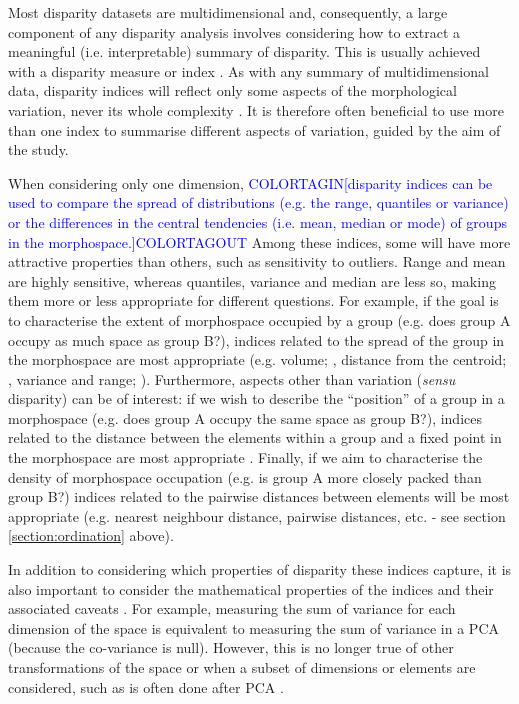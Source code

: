 \documentclass[12pt,letterpaper]{article}
\begin{document}
Most disparity datasets are multidimensional and, consequently, a large component of any disparity analysis involves considering how to extract a meaningful (i.e.
interpretable) summary of disparity.
This is usually achieved with a disparity measure or index \citep{Hopkins2017}.
As with any summary of multidimensional data, disparity indices will reflect only some aspects of the morphological variation, never its whole complexity \citep{GuillermeMOMS}.
It is therefore often beneficial to use more than one index to summarise different aspects of variation, guided by the aim of the study.

When considering only one dimension, \textcolor{blue}{COLORTAGIN[disparity indices can be used to compare the spread of distributions (e.g. the range, quantiles or variance) or the differences in the central tendencies (i.e. mean, median or mode) of groups in the morphospace.]COLORTAGOUT}
Among these indices, some will have more attractive properties than others, such as sensitivity to outliers.
Range and mean are highly sensitive, whereas quantiles, variance and median are less so, making them more or less appropriate for different questions.
For example, if the goal is to characterise the extent of morphospace occupied by a group (e.g. does group A occupy as much space as group B?), indices related to the spread of the group in the morphospace are most appropriate (e.g.
volume; \citealt{Diaz2016}, distance from the centroid; \citealt{Hopkins2017, Finlay2015}, variance and range; \citealt{Brusatte2008}).
Furthermore, aspects other than variation (\textit{sensu} disparity) can be of interest: if we wish to describe the ``position'' of a group in a morphospace (e.g.
does group A occupy the same space as group B?), indices related to the distance between the elements within a group and a fixed point in the morphospace are most appropriate \citep{GuillermeMOMS}.
Finally, if we aim to characterise the density of morphospace occupation (e.g.
is group A more closely packed than group B?) indices related to the pairwise distances between elements will be most appropriate (e.g. nearest neighbour distance, pairwise distances, etc. \citealt{Close2015} - see section \ref{section:ordination} above).

In addition to considering which properties of disparity these indices capture, it is also important to consider the mathematical properties of the indices and their associated caveats \citep{Wills2001, Ciampaglio2001}.
For example, measuring the sum of variance for each dimension of the space is equivalent to measuring the sum of variance in a PCA (because the co-variance is null).
However, this is no longer true of other transformations of the space or when a subset of dimensions or elements are considered, such as is often done after PCA \citep{Legendre2012}.
\end{document}
